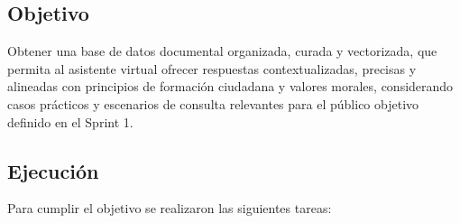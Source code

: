 \subsection{Objetivo}
Obtener una base de datos documental organizada, curada y vectorizada, que
permita al asistente virtual ofrecer respuestas contextualizadas, precisas y
alineadas con principios de formación ciudadana y valores morales, considerando
casos prácticos y escenarios de consulta relevantes para el público objetivo
definido en el Sprint 1.

\subsection{Ejecución}

Para cumplir el objetivo se realizaron las siguientes tareas:

